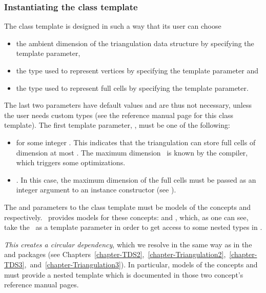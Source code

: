 \subsubsection{Instantiating the class template}

The 
class template is designed in such a way that its user can choose
\begin{itemize}
\item the ambient dimension of the triangulation data structure by specifying the  template parameter,
\item the type used to represent vertices by specifying the 
template parameter and
\item the type used to represent full cells by specifying the
 template parameter.
\end{itemize}

The last two parameters have default values and are thus not necessary, unless
the user needs custom types (see the reference manual page for this class
template). The first template parameter, , must be
one of the following:
\begin{itemize}
\item \ccPureGlobalScope{} for some integer \ad. This
indicates that the triangulation can store full cells of dimension at most
\ad. The maximum dimension \ad\ is known by the compiler, which
triggers some optimizations. 
\item \ccPureGlobalScope{}. In this case, the maximum
dimension of the full cells must be passed as an integer argument to an instance
constructor (see ).
\end{itemize}

The  and  parameters to the class template
must be models of the concepts  and
 respectively. \cgal\ provides models for these
concepts:  and
, which, as one
can see, take the \tds\ as a template parameter in order to get access to
some nested types in \tds.

{\em This creates a circular dependency}, which we resolve in the same way
as in the \cgal\  and  packages (see
Chapters~\ref{chapter-TDS2},~\ref{chapter-Triangulation2},~\ref{chapter-TDS3},~and~\ref{chapter-Triangulation3}).
In particular, models of the concepts  and
 must provide a nested template 
which is documented in those two concept's reference manual pages.

